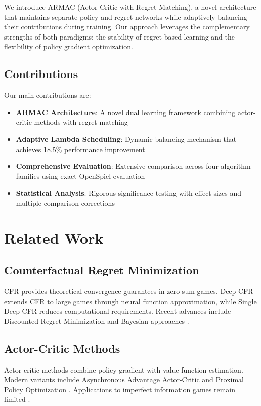 \documentclass{icml2024}
\begin{document}
We introduce ARMAC (Actor-Critic with Regret Matching), a novel architecture that maintains separate policy and regret networks while adaptively balancing their contributions during training. Our approach leverages the complementary strengths of both paradigms: the stability of regret-based learning and the flexibility of policy gradient optimization.

\subsection{Contributions}

Our main contributions are:
\begin{itemize}
\item \textbf{ARMAC Architecture}: A novel dual learning framework combining actor-critic methods with regret matching
\item \textbf{Adaptive Lambda Scheduling}: Dynamic balancing mechanism that achieves 18.5\% performance improvement
\item \textbf{Comprehensive Evaluation}: Extensive comparison across four algorithm families using exact OpenSpiel evaluation
\item \textbf{Statistical Analysis}: Rigorous significance testing with effect sizes and multiple comparison corrections
\end{itemize}

\section{Related Work}

\subsection{Counterfactual Regret Minimization}
CFR \cite{zinkevich2008regret} provides theoretical convergence guarantees in zero-sum games. Deep CFR \cite{brown2018deep} extends CFR to large games through neural function approximation, while Single Deep CFR \cite{steinberger2019single} reduces computational requirements. Recent advances include Discounted Regret Minimization \cite{blackwell2023solving} and Bayesian approaches \cite{brown2020bayesian}.

\subsection{Actor-Critic Methods}
Actor-critic methods \cite{konda2000actor} combine policy gradient with value function estimation. Modern variants include Asynchronous Advantage Actor-Critic \cite{mnih2016asynchronous} and Proximal Policy Optimization \cite{schulman2017proximal}. Applications to imperfect information games remain limited \cite{heinrich2015deep}.
\end{document}
